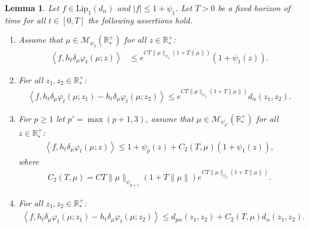 \documentclass[11pt,a4paper]{article}
\newcommand{\RRP}{\mathbb{R}^+_*}
\newcommand{\MC}{\mathcal{M}}
\newcommand{\brac}[1]{\left\langle#1\right\rangle}
\newtheorem{lemma}[theorem]{Lemma}
\begin{document}
\begin{lemma}\label{lem:wass-rescaled-derivative}
    Let $f \in \text{Lip}_1(d_\alpha)$ and $|f| \leq 1 + \psi_1$. Let $T > 0$ be a fixed horizon of time for all $t \in [0,T]$ the following assertions hold.
    \begin{enumerate}[label=(\roman*)]
        \item Assume that $\mu \in \MC_{\psi_3}(\RRP)$ for all $z \in \RRP$:
        \begin{align*}
            \brac{f,h_t\delta_\mu \varphi_t(\mu;z)} &\leq e^{CT\|\mu\|_{\psi_2}\left(1 + T\|\mu\|\right)} (1 + \psi_1(z)).
        \end{align*}
        \item For all $z_1,z_2 \in \RRP$:
            \begin{align*}
                \brac{f,h_t\delta_\mu \varphi_t(\mu;z_1) - h_t\delta_\mu \varphi_t(\mu;z_2)} \leq e^{CT\|\mu\|_{\psi_2}\left(1 + T\|\mu\|\right)} d_\alpha(z_1,z_2) .
            \end{align*}
        \item For $p \geq 1$ let $p' = \max(p+1,3)$, assume that $\mu \in \MC_{\psi_{p'}}(\RRP)$ for all $z \in \RRP$:
            \begin{align*}
                \brac{f,h_t\delta_\mu \varphi_t(\mu;z)} \leq  1 + \psi_p(z) + C_2(T,\mu )(1 + \psi_1(z)),
            \end{align*}
             where 
            \begin{align*}
                C_2(T,\mu ) = CT \|\mu\|_{\psi_{p+1}}\left(1 + T\|\mu\|\right)e^{CT\|\mu\|_{\psi_{2}}\left(1 + T\|\mu\|\right)}.
            \end{align*}
        \item For all $z_1,z_2 \in \RRP$:
            \begin{align*}
                \brac{f,h_t\delta_\mu \varphi_t(\mu;z_1) - h_t\delta_\mu \varphi_t(\mu;z_2)} \leq d_{p\alpha}(z_1,z_2) + C_2(T,\mu ) d_\alpha(z_1,z_2).
            \end{align*}
    \end{enumerate}
\end{lemma}
\end{document}
